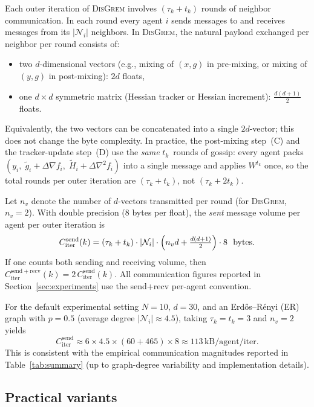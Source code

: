 \documentclass[10pt,twocolumn,letterpaper]{article}
\theoremstyle{compact}
\theoremstyle{compactremark}
\begin{document}
Each outer iteration of \textsc{DisGrem} involves $(\tau_k + t_k)$ rounds of neighbor communication.
In each round every agent $i$ sends messages to and receives messages from its $|\mathcal N_i|$ neighbors.
In \textsc{DisGrem}, the natural payload exchanged per neighbor per round consists of:
\begin{itemize}[leftmargin=1.2em,itemsep=1pt]
	\item two $d$-dimensional vectors (e.g., mixing of $(x,g)$ in pre-mixing, or mixing of $(y,g)$ in post-mixing): $2d$ floats,
	\item one $d\times d$ symmetric matrix (Hessian tracker or Hessian increment): $\tfrac{d(d+1)}{2}$ floats.
\end{itemize}
Equivalently, the two vectors can be concatenated into a single $2d$-vector; this does not change the byte complexity.
In practice, the post-mixing step~(C) and the tracker-update step~(D)
use the \emph{same} $t_k$~rounds of gossip: every agent packs
$(y_i,\; \tilde g_i+\Delta\nabla f_i,\; \tilde H_i+\Delta\nabla^2 f_i)$
into a single message and applies $W^{t_k}$ once, so the total rounds
per outer iteration are $(\tau_k+t_k)$, not $(\tau_k+2t_k)$.

Let $n_v$ denote the number of $d$-vectors transmitted per round (for \textsc{DisGrem}, $n_v=2$).
With double precision (8 bytes per float), the \emph{sent} message volume per agent per outer iteration is
\begin{equation}\label{eq:comm_cost_iter}
	C_{\mathrm{iter}}^{\mathrm{send}}(k)
	= (\tau_k+t_k)\cdot |\mathcal N_i|\cdot \Bigl(n_v d + \tfrac{d(d+1)}{2}\Bigr)\cdot 8 \ \ \text{bytes}.
\end{equation}
If one counts both sending and receiving volume, then
$C_{\mathrm{iter}}^{\mathrm{send+recv}}(k)=2\,C_{\mathrm{iter}}^{\mathrm{send}}(k)$.
All communication figures reported in Section~\ref{sec:experiments}
use the send+recv per-agent convention.

For the default experimental setting $N{=}10$, $d{=}30$, and an Erd\H{o}s--R\'enyi (ER)
graph with $p{=}0.5$ (average degree $|\mathcal N_i|\approx 4.5$),
taking $\tau_k=t_k=3$ and $n_v=2$ yields
\[
C_{\mathrm{iter}}^{\mathrm{send}}\!\approx\! 6\!\times\! 4.5\!\times\!(60\!+\!465)\!\times\! 8
\!\approx\! 113\,\text{kB/agent/iter}.
\]
This is consistent with the empirical communication magnitudes reported in
Table~\ref{tab:summary} (up to graph-degree variability and implementation details).
	
	\subsection{Practical variants}\label{ssec:variants}
	
\end{document}
